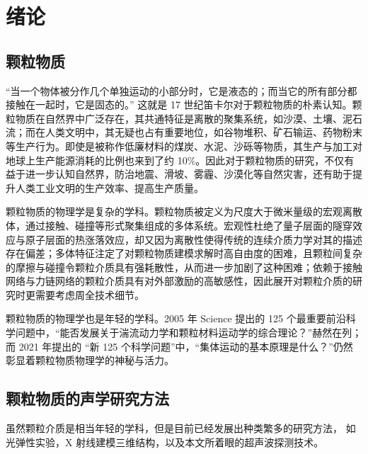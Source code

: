 
\chapter{绪论}

\section{颗粒物质}

“当一个物体被分作几个单独运动的小部分时，它是液态的；而当它的所有部分都接触在一起时，它是固态的。” 这就是 17 世纪笛卡尔对于颗粒物质的朴素认知。颗粒物质在自然界中广泛存在，其共通特征是离散的聚集系统，如沙漠、土壤、泥石流；而在人类文明中，其无疑也占有重要地位，如谷物堆积、矿石输运、药物粉末等生产行为。即使是被称作低廉材料的煤炭、水泥、沙砾等物质，其生产与加工对地球上生产能源消耗的比例也来到了约 \num{10}\%\cite{duran2000sands}。因此对于颗粒物质的研究，不仅有益于进一步认知自然界，防治地震、滑坡、雾霾、沙漠化等自然灾害，还有助于提升人类工业文明的生产效率、提高生产质量。

颗粒物质的物理学是复杂的学科。颗粒物质被定义为尺度大于微米量级的宏观离散体，通过接触、碰撞等形式聚集组成的多体系统。宏观性杜绝了量子层面的隧穿效应与原子层面的热涨落效应，却又因为离散性使得传统的连续介质力学对其的描述存在偏差\cite{RevModPhys.71.435}；多体特征注定了对颗粒物质建模求解时高自由度的困难，且颗粒间复杂的摩擦与碰撞令颗粒介质具有强耗散性，从而进一步加剧了这种困难；依赖于接触网络与力链网络的颗粒介质具有对外部激励的高敏感性，因此展开对颗粒介质的研究时更需要考虑周全技术细节。

颗粒物质的物理学也是年轻的学科。2005 年 Science 提出的 125 个最重要前沿科学问题\cite{doi:10.1126/science.309.5731.78b}中，“能否发展关于湍流动力学和颗粒材料运动学的综合理论？”赫然在列；而 2021 年提出的 “新 125 个科学问题”\cite{sanders2021125}中，“集体运动的基本原理是什么？”仍然彰显着颗粒物质物理学的神秘与活力。

\section{颗粒物质的声学研究方法}

虽然颗粒介质是相当年轻的学科，但是目前已经发展出种类繁多的研究方法， 如光弹性实验，X 射线建模三维结构，以及本文所着眼的超声波探测技术。


